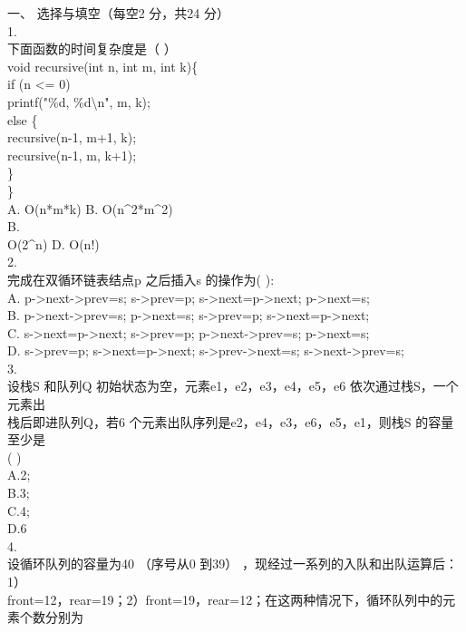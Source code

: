 
\begin{question}
一、 选择与填空（每空2 分，共24 分）\\
1.\\
下面函数的时间复杂度是（    ）\\
void recursive(int n, int m, int k)\{\\
if (n <= 0)\\
printf("\%d, \%d\textbackslash{}n", m, k);\\
else \{\\
recursive(n-1, m+1, k);\\
recursive(n-1, m, k+1);\\
\}\\
\}\\
A. O(n*m*k)        B. O(n\textasciicircum{}2*m\textasciicircum{}2)\\
B.\\
O(2\textasciicircum{}n)           D. O(n!)\\
2.\\
完成在双循环链表结点p 之后插入s 的操作为(       ):\\
A. p->next->prev=s; s->prev=p; s->next=p->next; p->next=s;\\
B. p->next->prev=s; p->next=s; s->prev=p; s->next=p->next;\\
C. s->next=p->next; s->prev=p; p->next->prev=s; p->next=s;\\
D. s->prev=p; s->next=p->next; s->prev->next=s; s->next->prev=s;\\
3.\\
设栈S 和队列Q 初始状态为空，元素e1，e2，e3，e4，e5，e6 依次通过栈S，一个元素出\\
栈后即进队列Q，若6 个元素出队序列是e2，e4，e3，e6，e5，e1，则栈S 的容量至少是\\
(       )\\
A.2;\\
B.3;\\
C.4;\\
D.6\\
4.\\
设循环队列的容量为40 （序号从0 到39） ，现经过一系列的入队和出队运算后： 1）\\
front=12，rear=19；2）front=19，rear=12；在这两种情况下，循环队列中的元素个数分别为\\

\end{question}
